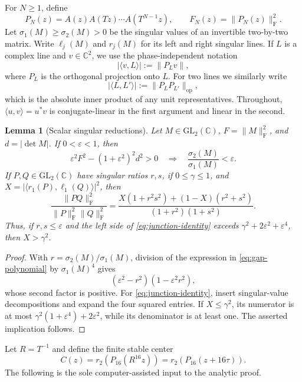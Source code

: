 \documentclass[11pt,reqno]{amsart}
\numberwithin{equation}{section}
\newtheorem{lemma}[theorem]{Lemma}
\theoremstyle{definition}
\newcommand{\C}{\mathbb C}
\newcommand{\ip}[2]{\langle #1,#2\rangle}
\newcommand{\norm}[1]{\lVert #1\rVert}
\newcommand{\abs}[1]{\lvert #1\rvert}
\newcommand{\Frob}{\mathrm F}
\begin{document}
For $N\ge1$, define
\begin{equation}\label{eq:PN}
 P_N(z)=A(z)A(Tz)\cdots A(T^{N-1}z),\qquad
 F_N(z)=\norm{P_N(z)}_{\Frob}^2.
\end{equation}
Let $\sigma_1(M)\ge\sigma_2(M)>0$ be the singular values of an invertible
two-by-two matrix.  Write $\ell_j(M)$ and $r_j(M)$ for its left and right
singular lines.  If $L$ is a complex line and $v\in\C^2$, we use the
phase-independent notation
\[
 \abs{\ip{v}{L}}:=\norm{P_L v},
\]
where $P_L$ is the orthogonal projection onto $L$.  For two lines we similarly
write
\[
 \abs{\ip{L}{L'}}:=\norm{P_L P_{L'}}_{\mathrm{op}},
\]
which is the absolute inner product of any unit representatives.
Throughout, $\ip{u}{v}=u^*v$ is conjugate-linear in the first argument and
linear in the second.

\begin{lemma}[Scalar singular reductions]\label{lem:scalar-reductions}
Let $M\in\mathrm{GL}_2(\C)$, $F=\norm M_{\Frob}^2$, and
$d=\abs{\det M}$.  If $0<\varepsilon<1$, then
\begin{equation}\label{eq:gap-polynomial}
 \varepsilon^2F^2-(1+\varepsilon^2)^2d^2>0
 \quad\Longrightarrow\quad
 \frac{\sigma_2(M)}{\sigma_1(M)}<\varepsilon.
\end{equation}
If $P,Q\in\mathrm{GL}_2(\C)$ have singular ratios $r,s$, if
$0\le\gamma\le1$, and
$X=\abs{\ip{r_1(P)}{\ell_1(Q)}}^2$, then
\begin{equation}\label{eq:junction-identity}
 \frac{\norm{PQ}_{\Frob}^2}
 {\norm P_{\Frob}^2\norm Q_{\Frob}^2}
 =\frac{X(1+r^2s^2)+(1-X)(r^2+s^2)}
 {(1+r^2)(1+s^2)}.
\end{equation}
Thus, if $r,s\le\varepsilon$ and the left side of
\eqref{eq:junction-identity} exceeds
$\gamma^2+2\varepsilon^2+\varepsilon^4$, then $X>\gamma^2$.
\end{lemma}

\begin{proof}
With $r=\sigma_2(M)/\sigma_1(M)$, division of the expression in
\eqref{eq:gap-polynomial} by $\sigma_1(M)^4$ gives
\[
 (\varepsilon^2-r^2)(1-\varepsilon^2r^2),
\]
whose second factor is positive.  For \eqref{eq:junction-identity}, insert
singular-value decompositions and expand the four squared entries.  If
$X\le\gamma^2$, its numerator is at most
$\gamma^2(1+\varepsilon^4)+2\varepsilon^2$, while its denominator is at
least one.  The asserted implication follows.
\end{proof}

Let $R=T^{-1}$ and define the finite stable center
\begin{equation}\label{eq:finite-center-first}
 C(z)=r_2(P_{16}(R^{16}z))=r_2(P_{16}(z+16\tau)).
\end{equation}
The following is the sole computer-assisted input to the analytic proof.
\end{document}
